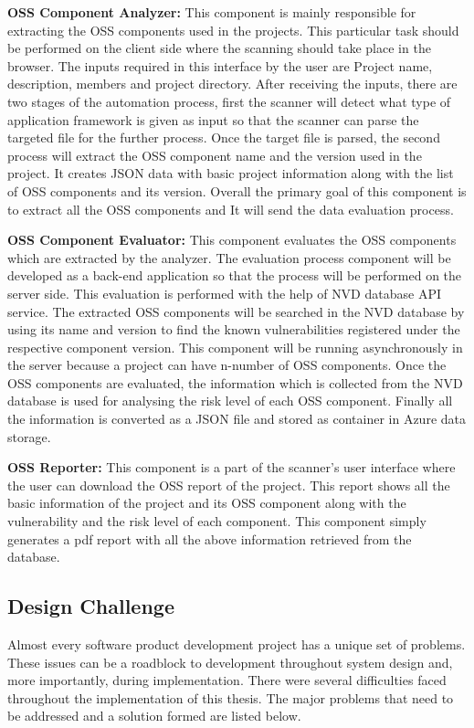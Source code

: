 \textbf{\acs{OSS} Component Analyzer:} This component is mainly responsible for extracting the \acs{OSS} components used in the projects. This particular task should be performed on the client side where the scanning should take place in the browser. The inputs required in this interface by the user are Project name, description, members and project directory. After receiving the inputs, there are two stages of the automation process, first the scanner will detect what type of application framework is given as input so that the scanner can parse the targeted file for the further process. Once the target file is parsed, the second process will extract the \acs{OSS} component name and the version used in the project. It creates \acs{JSON} data with basic project information along with the list of \acs{OSS} components and its version. Overall the primary goal of this component is to extract all the \acs{OSS} components and It will send the data evaluation process.
	
\textbf{\acs{OSS} Component Evaluator:} This component evaluates the \acs{OSS} components which are extracted by the analyzer. The evaluation process component will be developed as a back-end application so that the process will be performed on the server side. This evaluation is performed with the help of \acs{NVD} database \acs{API} service. The extracted \acs{OSS} components will be searched in the \acs{NVD} database by using its name and version to find the known vulnerabilities registered under the respective component version. This component will be running asynchronously in the server because a project can have n-number of \acs{OSS} components. Once the \acs{OSS} components are evaluated, the information which is collected from the \acs{NVD} database is used for analysing the risk level of each \acs{OSS} component. Finally all the information is converted as a \acs{JSON} file and stored as container in Azure data storage.
	
\textbf{\acs{OSS} Reporter:} This component is a part of the scanner’s user interface where the user can download the \acs{OSS} report of the project. This report shows all the basic information of the project and its \acs{OSS} component along with the vulnerability and the risk level of each component. This component simply generates a pdf report with all the above information retrieved from the database.
	
\subsection{Design Challenge}
Almost every software product development project has a unique set of problems. These issues can be a roadblock to development throughout system design and, more importantly, during implementation. There were several difficulties faced throughout the implementation of this thesis. The major problems that need to be addressed and a solution formed are listed below.

